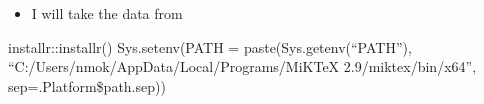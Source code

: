 \documentclass[]{article}
\providecommand{\tightlist}{%
  \setlength{\itemsep}{0pt}\setlength{\parskip}{0pt}}
\begin{document}
\begin{itemize}
  \begin{itemize}
  \tightlist
  \item
    I will take the data from
  \end{itemize}
\end{itemize}

installr::installr() Sys.setenv(PATH = paste(Sys.getenv(``PATH''),
``C:/Users/nmok/AppData/Local/Programs/MiKTeX 2.9/miktex/bin/x64'',
sep=.Platform\$path.sep))
\end{document}
